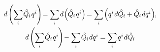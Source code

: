 \begin{otherlanguage}{russian}
\nopagebreak\vspace{-0.2em}\begin{equation*}
\begin{array}{c}\small
d \hspace{-0.1ex} \left( \hspace{-0.1ex} \scalebox{0.95}[1]{$\displaystyle \sum_{\smash{i}}$} \hspace{.2ex} \mathcircabove{Q}_{\hspace{-0.1ex}i} \hspace{.2ex} q^i \hspace{-0.12ex} \right) \hspace{-0.5ex}
= \scalebox{0.95}[1]{$\displaystyle \sum_{\smash{i}}$} \hspace{.25ex} d \hspace{-0.25ex} \left( \hspace{-0.1ex} \mathcircabove{Q}_{\hspace{-0.1ex}i} \hspace{.2ex} q^i \right) \hspace{-0.3ex}
= \scalebox{0.95}[1]{$\displaystyle \sum_{\smash{i}}$} \hspace{-0.16ex} \left(
q^i \hspace{.2ex} d \mathcircabove{Q}_{\hspace{-0.1ex}i}
+ \mathcircabove{Q}_{\hspace{-0.1ex}i} \hspace{.2ex} dq^i \right)
\hspace{-0.64ex} ,
\\[1.25em]
%
\small
d \hspace{-0.1ex} \left( \hspace{-0.1ex} \scalebox{0.95}[1]{$\displaystyle \sum_{\smash{i}}$} \hspace{.2ex} \mathcircabove{Q}_{\hspace{-0.1ex}i} \hspace{.2ex} q^i \hspace{-0.12ex} \right) \hspace{-0.4ex}
- \hspace{.1ex} \tikzmark{beginLegendreOfPotentialEnergy} \scalebox{0.95}[1]{$\displaystyle \sum_{\smash{i}}$} \hspace{.2ex} \mathcircabove{Q}_{\hspace{-0.1ex}i} \hspace{.2ex} dq^i \tikzmark{endLegendreOfPotentialEnergy}
= \scalebox{0.95}[1]{$\displaystyle \sum_{\smash{i}}$} \hspace{.32ex} q^i \hspace{.2ex} d\mathcircabove{Q}_{\hspace{-0.1ex}i}

\end{array}
\end{equation*}
\end{otherlanguage}
